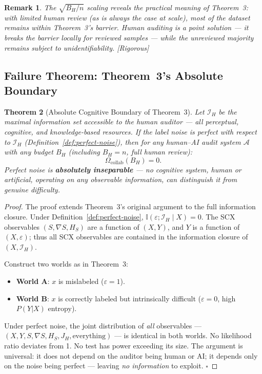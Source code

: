 \documentclass[12pt,a4paper]{article}
\newtheorem{theorem}{Theorem}[section]
\newtheorem{remark}[theorem]{Remark}
\newcommand{\rigorous}{\textcolor{green!50!black}{\small\textsf{[Rigorous]}}}
\newcommand{\I}{\mathbb{I}}
\newcommand{\cA}{\mathcal{A}}
\newcommand{\cI}{\mathcal{I}}
\begin{document}
\begin{remark}
The $\sqrt{B_H/n}$ scaling reveals the practical meaning of Theorem~3:
with limited human review (as is always the case at scale), most of the
dataset remains within Theorem~3's barrier.  Human auditing is a
\emph{point solution} — it breaks the barrier locally for reviewed samples
— while the unreviewed majority remains subject to unidentifiability.
\rigorous
\end{remark}

\subsection{Failure Theorem: Theorem~3's Absolute Boundary}

\begin{theorem}[Absolute Cognitive Boundary of Theorem~3]
\label{thm:absolute-boundary}
Let $\cI_H$ be the maximal information set accessible to the human auditor —
all perceptual, cognitive, and knowledge-based resources.  If the label noise
is perfect with respect to $\cI_H$ (Definition~\ref{def:perfect-noise}), then
for \emph{any} human--AI audit system $\cA$ with \emph{any} budget $B_H$
(including $B_H = n$, full human review):
\begin{equation}\label{eq:absolute-boundary}
    \Omega_{\mathrm{collab}}(B_H) = 0.
\end{equation}
Perfect noise is \textbf{absolutely inseparable} — no cognitive system,
human or artificial, operating on any observable information, can
distinguish it from genuine difficulty.
\end{theorem}

\begin{proof}
The proof extends Theorem~3's original argument to the full information
closure.  Under Definition~\ref{def:perfect-noise},
$\I(\varepsilon; \cI_H \mid X) = 0$.  The SCX observables
$(S, \nabla S, H_S)$ are a function of $(X, Y)$, and $Y$ is a function of
$(X, \varepsilon)$; thus all SCX observables are contained in the
information closure of $(X, \cI_H)$.

Construct two worlds as in Theorem~3:
\begin{itemize}
    \item \textbf{World A}: $x$ is mislabeled ($\varepsilon = 1$).
    \item \textbf{World B}: $x$ is correctly labeled but intrinsically
          difficult ($\varepsilon = 0$, high $P(Y|X)$ entropy).
\end{itemize}
Under perfect noise, the joint distribution of \emph{all} observables —
$(X, Y, S, \nabla S, H_S, J_H, \text{everything})$ — is identical in both
worlds.  No likelihood ratio deviates from 1.  No test has power exceeding
its size.  The argument is universal: it does not depend on the auditor
being human or AI; it depends only on the noise being perfect — leaving
\emph{no information} to exploit.  $\square$
\end{proof}
\end{document}
